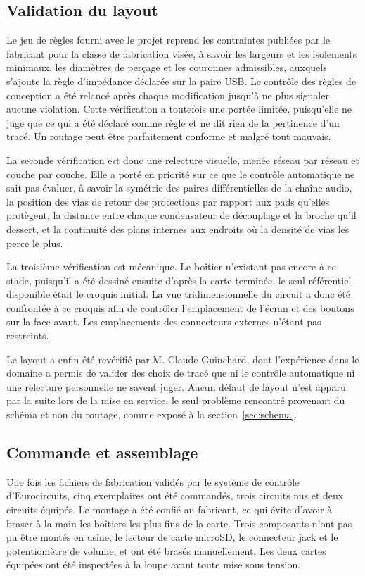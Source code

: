 \subsection{Validation du layout}

Le jeu de règles fourni avec le projet reprend les contraintes publiées par le fabricant pour la classe de fabrication visée, à savoir les largeurs et les isolements minimaux, les diamètres de perçage et les couronnes admissibles, auxquels s'ajoute la règle d'impédance déclarée sur la paire USB. Le contrôle des règles de conception a été relancé après chaque modification jusqu'à ne plus signaler aucune violation. Cette vérification a toutefois une portée limitée, puisqu'elle ne juge que ce qui a été déclaré comme règle et ne dit rien de la pertinence d'un tracé. Un routage peut être parfaitement conforme et malgré tout mauvais.

La seconde vérification est donc une relecture visuelle, menée réseau par réseau et couche par couche. Elle a porté en priorité sur ce que le contrôle automatique ne sait pas évaluer, à savoir la symétrie des paires différentielles de la chaîne audio, la position des vias de retour des protections par rapport aux pads qu'elles protègent, la distance entre chaque condensateur de découplage et la broche qu'il dessert, et la continuité des plans internes aux endroits où la densité de vias les perce le plus.

La troisième vérification est mécanique. Le boîtier n'existant pas encore à ce stade, puisqu'il a été dessiné ensuite d'après la carte terminée, le seul référentiel disponible était le croquis initial. La vue tridimensionnelle du circuit a donc été confrontée à ce croquis afin de contrôler l'emplacement de l'écran et des boutons sur la face avant. Les emplacements des connecteurs externes n'étant pas restreints.

Le layout a enfin été revérifié par M. Claude Guinchard, dont l'expérience dans le domaine a permis de valider des choix de tracé que ni le contrôle automatique ni une relecture personnelle ne savent juger. Aucun défaut de layout n'est apparu par la suite lors de la mise en service, le seul problème rencontré provenant du schéma et non du routage, comme exposé à la section~\ref{sec:schema}.

\subsection{Commande et assemblage}

Une fois les fichiers de fabrication validés par le système de contrôle d'Eurocircuits, cinq exemplaires ont été commandés, trois circuits nus et deux circuits équipés. Le montage a été confié au fabricant, ce qui évite d'avoir à braser à la main les boîtiers les plus fins de la carte. Trois composants n'ont pas pu être montés en usine, le lecteur de carte microSD, le connecteur jack et le potentiomètre de volume, et ont été brasés manuellement. Les deux cartes équipées ont été inspectées à la loupe avant toute mise sous tension.